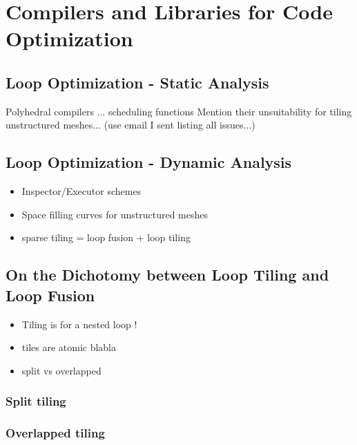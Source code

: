 


\section{Compilers and Libraries for Code Optimization}
\label{sec:bkg:codeopt}


\subsection{Loop Optimization - Static Analysis}
\label{sec:bkg:poly}
Polyhedral compilers ...
scheduling functions
Mention their unsuitability for tiling unstructured meshes... (use email I sent listing all issues...)




\subsection{Loop Optimization - Dynamic Analysis}
\label{sec:bkg:ie}
\begin{itemize}
\item Inspector/Executor schemes
\item Space filling curves for unstructured meshes
\item sparse tiling = loop fusion + loop tiling
\end{itemize}


\subsection{On the Dichotomy between Loop Tiling and Loop Fusion}
\label{sec:bkg:tiling}

\begin{itemize}
\item Tiling is for a nested loop ! 
\item tiles are atomic blabla
\item split vs overlapped
\end{itemize}


\subsubsection{Split tiling}


\subsubsection{Overlapped tiling}
 
